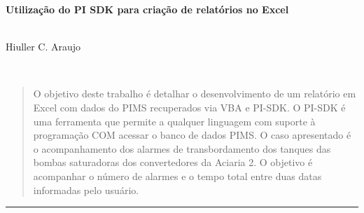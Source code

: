\begin{center}
{\sffamily \begin{huge}\textbf{
	Utilização do PI SDK para criação de relatórios no Excel
	}\end{huge}\\[10pt]
{Hiuller C. Araujo}
}\\
	\begin{abstract}
	O objetivo deste trabalho é detalhar o desenvolvimento de um relatório em Excel com dados do PIMS recuperados via VBA e PI-SDK. O PI-SDK é uma ferramenta que permite a qualquer linguagem com suporte à programação COM acessar o banco de dados PIMS. O caso apresentado é o acompanhamento dos alarmes de transbordamento dos tanques das bombas saturadoras dos convertedores da Aciaria 2. O objetivo é acompanhar o número de alarmes e o tempo total entre duas datas informadas pelo usuário. 
	\end{abstract}
	\rule{4in}{0.5pt}
\end{center}
